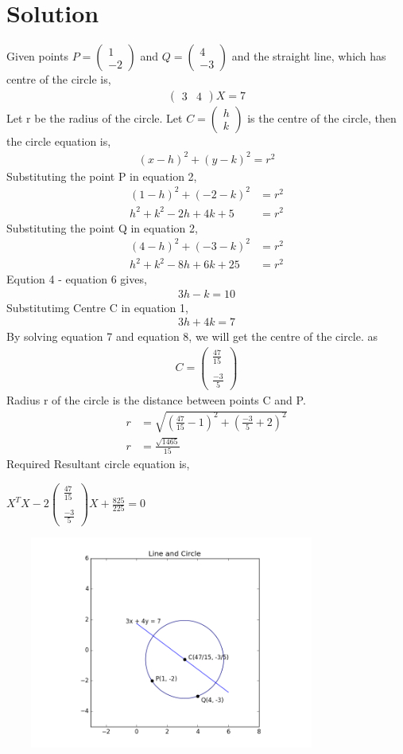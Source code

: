 \documentclass[journal,12pt,twocolumn]{IEEEtran}
\newcommand{\myvec}[1]{\ensuremath{\begin{pmatrix}#1\end{pmatrix}}}
\begin{document}
\section{Solution}
Given points $P = \myvec{ 1 \\ -2 }$ and $Q = \myvec{ 4 \\ -3 }$ and the straight line, which has centre of the circle is,
\begin{align} 
\myvec{ 3 & 4 }X = 7
\end {align}
Let r be the radius of the circle.
Let $C = \myvec{ h \\ k }$ is the centre of the circle, then the circle equation is,
\begin{align} 
(x-h)^2 + (y-k)^2 = r^2
\end {align}
Substituting the point P in equation 2,
\begin{align} 
(1-h)^2 + (-2-k)^2 &= r^2 \\
h^2 + k^2 -2h + 4k +5 &= r^2
\end {align}
Substituting the point Q in equation 2,
\begin{align} 
(4-h)^2 + (-3-k)^2 &= r^2 \\
h^2 + k^2 -8h + 6k + 25 &= r^2
\end {align}
Eqution 4 - equation 6 gives,
\begin{align} 
3h - k = 10
\end {align}
Substitutimg Centre C in equation 1,
\begin{align} 
3h + 4k = 7
\end {align}
By solving equation 7 and equation 8, we will get the centre of the circle.
 as 
\begin{align} 
C = \myvec{ \frac{47}{15}\\ \\ \frac{-3}{5} }
\end {align}
Radius r of the circle is the distance between points C and P.
\begin{align} 
r &= \sqrt{(\frac{47}{15} - 1)^2 + (\frac{-3}{5} + 2)^2} \\
r &= \frac{\sqrt{1465}}{15}
\end {align}
Required Resultant circle equation is,


$X^TX - 2\myvec{ \frac{47}{15} \\ \\ \frac{-3}{5} }X + \frac{825}{225} = 0$

\includegraphics[width=11cm, height=7cm]{figure_1}
\end{document}
